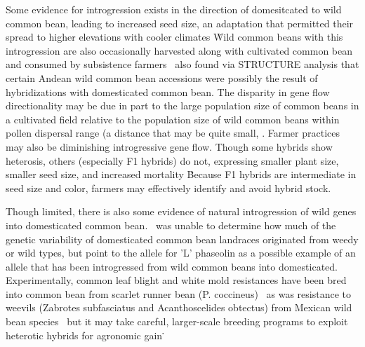 \documentclass[11pt]{article}
\begin{document}
Some evidence for introgression exists in the direction of domesitcated to wild common bean, leading to increased seed size, an adaptation that permitted their spread to higher elevations with cooler climates \cite{debouck1993genetic}\.
Wild common beans with this introgression are also occasionally harvested along with cultivated common bean and consumed by subsistence farmers \cite{papa2003asymmetry}\.
\cite{kwak2009structure}\ also found via STRUCTURE analysis that certain Andean wild common bean accessions were possibly the result of hybridizations with domesticated common bean.
The disparity in gene flow directionality may be due in part to the large population size of common beans in a cultivated field relative to the population size of wild common beans within pollen dispersal range (a distance that may be quite small, \cite{papa2003asymmetry}\).
Farmer practices may also be diminishing introgressive gene flow.
Though some hybrids show heterosis, others (especially F1 hybrids) do not, expressing smaller plant size, smaller seed size, and increased mortality \cite{gutierrez1985heterosis, paredes1995extensive}\.
Because F1 hybrids are intermediate in seed size and color, farmers may effectively identify and avoid hybrid stock.

Though limited, there is also some evidence of natural introgression of wild genes into domesticated common bean.
\cite{papa2003asymmetry}\ was unable to determine how much of the genetic variability of domesticated common bean landraces originated from weedy or wild types, but point to the allele for 'L' phaseolin as a possible example of an allele that has been introgressed from wild common beans into domesticated.
Experimentally, common leaf blight and white mold resistances have been bred into common bean from scarlet runner bean (P. coccineus) \cite{park1987transfer, schwartz2006inheritance}\, as was resistance to weevils (Zabrotes subfasciatus and Acanthoscelides obtectus) from Mexican wild bean species \cite{kornegay1991inheritance}\, but it may take careful, larger-scale breeding programs to exploit heterotic hybrids for agronomic gain \cite{paredes1995extensive}\.
\end{document}
